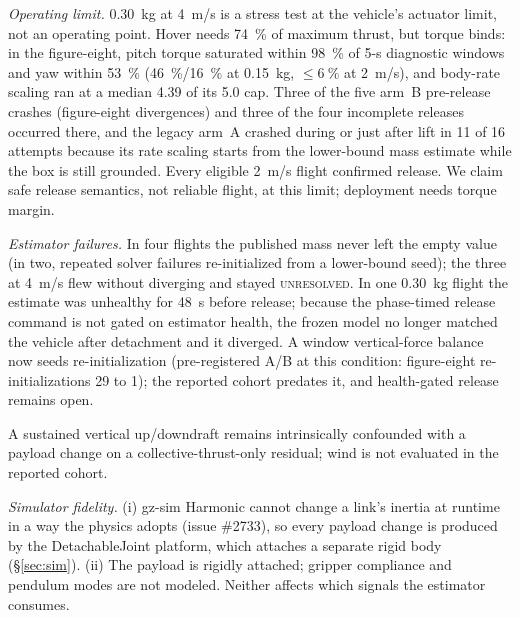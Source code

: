 \documentclass[conference]{IEEEtran}
\begin{document}
\emph{Operating limit.} \SI{0.30}{kg} at \SI{4}{m/s} is a stress test at the vehicle's actuator
limit, not an operating point. Hover needs \SI{74}{\percent} of maximum thrust, but torque binds:
in the figure-eight, pitch torque saturated within \SI{98}{\percent} of 5-s diagnostic windows
and yaw within \SI{53}{\percent} (\SI{46}{\percent}/\SI{16}{\percent} at \SI{0.15}{kg},
$\le\SI{6}{\percent}$ at \SI{2}{m/s}), and body-rate scaling ran at a median 4.39 of its 5.0 cap. Three of the five arm~B
pre-release crashes (figure-eight divergences) and three of the four incomplete releases occurred
there, and the legacy arm~A crashed during or just after lift in 11 of 16 attempts because its
rate scaling starts from the lower-bound mass estimate while the box is still grounded. Every
eligible \SI{2}{m/s} flight confirmed release. We claim safe release semantics, not reliable
flight, at this limit; deployment needs torque margin.

\emph{Estimator failures.} In four flights the published mass never left the empty value (in two,
repeated solver failures re-initialized from a lower-bound seed); the three at \SI{4}{m/s} flew
without diverging and stayed \textsc{unresolved}. In one \SI{0.30}{kg} flight the estimate was
unhealthy for \SI{48}{s} before release; because the phase-timed release command is not gated on
estimator health, the frozen model no longer matched the vehicle after detachment and it diverged.
A window vertical-force balance now seeds re-initialization (pre-registered A/B at this
condition: figure-eight re-initializations 29 to 1); the reported cohort predates it, and
health-gated release remains open.

A sustained vertical up/downdraft remains intrinsically confounded with a payload change on a
collective-thrust-only residual; wind is not evaluated in the reported cohort.

\emph{Simulator fidelity.} (i) gz-sim Harmonic cannot change a link's inertia at runtime in a
way the physics adopts (issue \#2733), so every payload change is produced by the
DetachableJoint platform, which attaches a separate rigid body (\S\ref{sec:sim}). (ii) The payload is rigidly attached; gripper compliance and pendulum modes
are not modeled. Neither affects which signals the estimator consumes.
\end{document}
